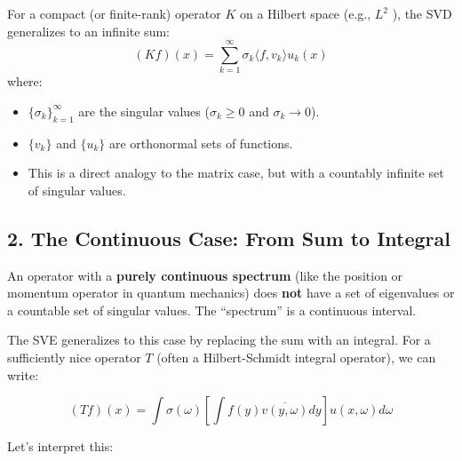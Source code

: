 \documentclass[aps,prl,reprint]{revtex4-2}
\begin{document}
For a compact (or finite-rank) operator $K$ on a Hilbert space (e.g., $L^2$%
), the SVD generalizes to an infinite sum: 
\begin{equation*}
(Kf)(x) = \sum_{k=1}^\infty \sigma_k \langle f, v_k \rangle u_k(x) 
\end{equation*}
where:

\begin{itemize}
\item $\{\sigma_k\}_{k=1}^\infty$ are the singular values ($\sigma_k \ge 0$
and $\sigma_k \to 0$).

\item $\{v_k\}$ and $\{u_k\}$ are orthonormal sets of functions.

\item This is a direct analogy to the matrix case, but with a countably
infinite set of singular values.
\end{itemize}

\subsection*{2. The Continuous Case: From Sum to Integral}

An operator with a \textbf{purely continuous spectrum} (like the position or
momentum operator in quantum mechanics) does \textbf{not} have a set of
eigenvalues or a countable set of singular values. The ``spectrum'' is a
continuous interval.

The SVE generalizes to this case by replacing the sum with an integral. For
a sufficiently nice operator $T$ (often a Hilbert-Schmidt integral
operator), we can write:

\begin{equation*}
(Tf)(x) = \int \sigma(\omega) \left[ \int f(y) \overline{v(y, \omega)} dy %
\right] u(x, \omega) d\omega 
\end{equation*}

Let's interpret this:
\end{document}
